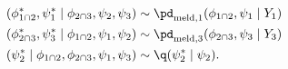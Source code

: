 \begin{align}
  (\phi_{1 \cap 2}^{*}, \psi_{1}^{*} \mid \phi_{2 \cap 3}, \psi_{2}, \psi_{3}) &\sim \pd_{\text{meld}, 1}(\phi_{1 \cap 2}, \psi_{1} \mid Y_{1}) \\ 
  (\phi_{2 \cap 3}^{*}, \psi_{3}^{*} \mid \phi_{1 \cap 2}, \psi_{1}, \psi_{2}) &\sim \pd_{\text{meld}, 3}(\phi_{2 \cap 3}, \psi_{3} \mid Y_{3}) \\
  (\psi_{2}^{*} \mid \phi_{1 \cap 2}, \phi_{2 \cap 3}, \psi_{1}, \psi_{3}) &\sim \q(\psi_{2}^{*} \mid \psi_{2}).
  \label{eqn:stage-two-proposals}
\end{align}
